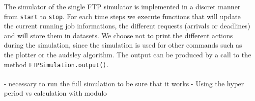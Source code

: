 \documentclass[letterpaper]{article}
\begin{document}
The simulator of the single FTP simulator is implemented in a discret manner
from \texttt{start} to \texttt{stop}. For each time steps
we execute functions that will update the
current running job informations, the different requests (arrivals or deadlines)
and will store them in datasets. We choose not to print the different
actions during the simulation,
since the simulation is used for other commands such as
the plotter or the audsley algorithm. The output can be produced by
a call to the method \texttt{FTPSimulation.output()}.

\paragraph{}




- necessary to run the full simulation to be sure that it works
- Using the hyper period vs calculation with modulo
\end{document}

